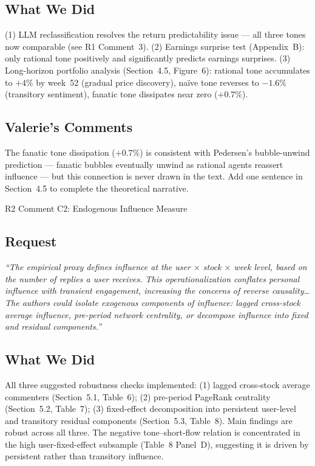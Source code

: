 \documentclass[11pt]{article}
\makeatletter
\def\section{\@ifstar\section@star\section@nostar}
\def\section@star#1{%
  \par\vspace{1.5ex}%
  \noindent{\normalsize\bfseries#1}\par%
  \vspace{0.5ex}%
  \@afterheading%
}
\def\section@nostar#1{%
  \par\vspace{1.5ex}%
  \noindent{%
    \setlength{\fboxsep}{4pt}%
    \colorbox{sectionbg}{\parbox{\dimexpr\textwidth-8pt\relax}{\normalsize\bfseries\strut#1\strut}}%
  }\par%
  \vspace{0.5ex}%
  \@afterheading%
}
\newcommand{\concern}[1]{#1}
\makeatother
\begin{document}
\subsection*{What We Did}
(1) LLM reclassification resolves the return predictability issue --- all
three tones now comparable (see R1 Comment~3). (2) Earnings surprise test
(Appendix~B): only rational tone positively and significantly predicts
earnings surprises. (3) Long-horizon portfolio analysis (Section~4.5,
Figure~6): rational tone accumulates to $+4\%$ by week~52 (gradual price
discovery), na\"{i}ve tone reverses to $-1.6\%$ (transitory sentiment),
fanatic tone dissipates near zero ($+0.7\%$).

\subsection*{Valerie's Comments}
\concern{The fanatic tone dissipation ($+0.7\%$) is consistent with
Pedersen's bubble-unwind prediction --- fanatic bubbles eventually unwind
as rational agents reassert influence --- but this connection is never drawn
in the text. Add one sentence in Section~4.5 to complete the theoretical
narrative.}

\section{R2 Comment C2: Endogenous Influence Measure}

\subsection*{Request}
\begin{mdframed}
\textit{``The empirical proxy defines influence at the user $\times$ stock
$\times$ week level, based on the number of replies a user receives. This
operationalization conflates personal influence with transient engagement,
increasing the concerns of reverse causality\ldots The authors could isolate
exogenous components of influence: lagged cross-stock average influence,
pre-period network centrality, or decompose influence into fixed and residual
components.''}
\end{mdframed}

\subsection*{What We Did}
All three suggested robustness checks implemented: (1) lagged cross-stock
average commenters (Section~5.1, Table~6); (2) pre-period PageRank centrality
(Section~5.2, Table~7); (3) fixed-effect decomposition into persistent
user-level and transitory residual components (Section~5.3, Table~8). Main
findings are robust across all three. The negative tone--short-flow relation
is concentrated in the high user-fixed-effect subsample (Table~8 Panel~D),
suggesting it is driven by persistent rather than transitory influence.
\end{document}
